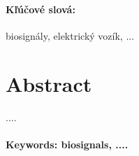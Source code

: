 \documentclass[12pt, twoside]{book}
\begin{document}
\vfill
\paragraph*{Kľúčové slová:} biosignály, elektrický vozík, ... 


\newpage 
\section*{Abstract}
....


\paragraph*{Keywords: biosignals, ....} 


%
%



\newpage 

\tableofcontents






\mainmatter












% 






\nocite{*}




%
\end{document}
